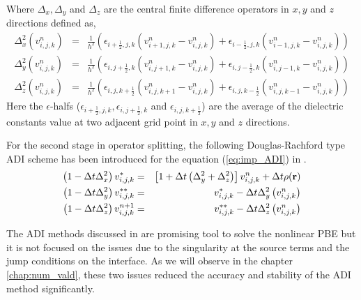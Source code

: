 Where $\Delta_x,\Delta_y$ and $\Delta_z$ are the central finite difference operators in $x,y$ and $z$ directions defined as, 
  \begin{eqnarray}
	\Delta_x^2\left(v_{i,j,k}^n\right)&=& \frac{1}{h^2} \left(\epsilon_{i+\frac{1}{2},j,k}(v_{i+1,j,k}^n-v_{i,j,k}^n)+\epsilon_{i-\frac{1}{2},j,k}(v_{i-1,j,k}^n-v_{i,j,k}^n)\right) \nonumber \\
	\Delta_y^2\left(v_{i,j,k}^n\right)&=& \frac{1}{h^2} \left(\epsilon_{i,j+\frac{1}{2},k}(v_{i,j+1,k}^n-v_{i,j,k}^n)+\epsilon_{i,j-\frac{1}{2},k}(v_{i,j-1,k}^n-v_{i,j,k}^n)\right)\\ \label{eq:dif_opx_adi1}
	\Delta_z^2\left(v_{i,j,k}^n\right)&=&\frac{1}{h^2} \left(\epsilon_{i,j,k+\frac{1}{2}}(v_{i,j,k+1}^n-v_{i,j,k}^n)+\epsilon_{i,j,k-\frac{1}{2}}(v_{i,j,k-1}^n-v_{i,j,k}^n)\right)  \nonumber
\end{eqnarray}
Here the $\epsilon$-halfs ($\epsilon_{i+\frac{1}{2},j,k},\epsilon_{i,j+\frac{1}{2},k}$ and $\epsilon_{i,j,k+\frac{1}{2}}$) are the average of the dielectric constants value at two adjacent grid point in $x,y$ and $z$ directions. 

For the second stage in operator splitting, the following Douglas-Rachford type ADI scheme has been introduced for the equation (\ref{eq:imp_ADI}) in \cite{Geng2013_Fully}.   
\begin{eqnarray}
		\left(1- \Delta t \Delta_x^2\right)v_{i,j,k}^{*}&=&\left[1+ \Delta t \left(\Delta_y^2+\Delta_z^2 \right)\right]v_{i,j,k}^{n}+\Delta t \rho({\bf r})\label{eq_ADI1}\nonumber \\ 
		\left(1-\Delta t \Delta_y^2\right)v_{i,j,k}^{**}&=&v_{i,j,k}^{*}- \Delta t \Delta_y^2\left(v_{i,j,k}^{n}\right)\label{GFM-ADI2}\\
		\left(1- \Delta t \Delta_z^2\right)v_{i,j,k}^{n+1}&=&v_{i,j,k}^{**}- \Delta t \Delta_z^2\left(v_{i,j,k}^{n}\right)\label{GFM-ADI3}\nonumber
\end{eqnarray} 

The ADI methods discussed in \cite{Geng2013_Fully} are promising tool to solve the nonlinear PBE but it is not focused on the issues due to the singularity at the source terms and the jump conditions on the interface. As we will observe in the chapter \ref{chap:num_vald}, these two issues reduced the accuracy and stability of the ADI method significantly.  
       
